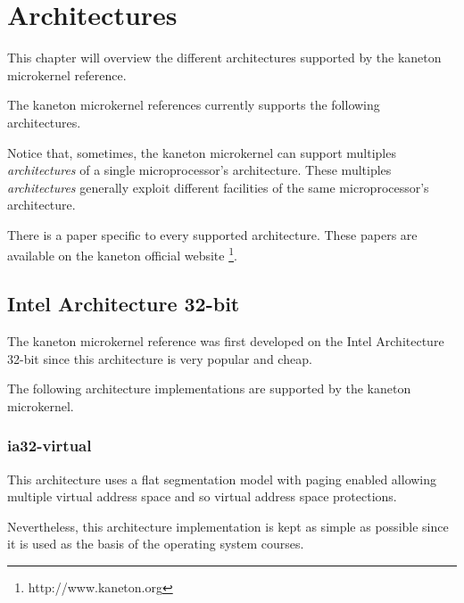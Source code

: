 
%
%

\chapter{Architectures}

This chapter will overview the different architectures supported by
the kaneton microkernel reference.

\newpage

%
%

The kaneton microkernel references currently supports the following
architectures.

Notice that, sometimes, the kaneton microkernel can support multiples
\textit{architectures} of a single microprocessor's architecture.
These multiples \textit{architectures} generally exploit different
facilities of the same microprocessor's architecture.

There is a paper specific to every supported architecture. These papers
are available on the kaneton official website
  \footnote{http://www.kaneton.org}.

%
%

\section{Intel Architecture 32-bit}

The kaneton microkernel reference was first developed on the Intel Architecture
32-bit since this architecture is very popular and cheap.

The following architecture implementations are supported by the kaneton
microkernel.

%
%

\subsection{ia32-virtual}

This architecture uses a flat segmentation model with paging enabled
allowing multiple virtual address space and so virtual address space
protections.

Nevertheless, this architecture implementation is kept as simple as possible
since it is used as the basis of the operating system courses.

